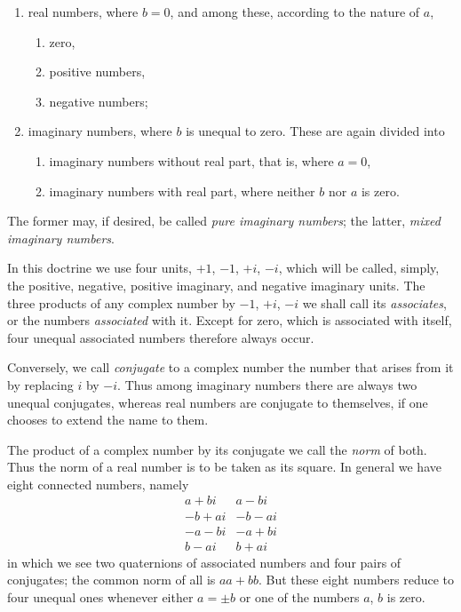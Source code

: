 \documentclass[12pt]{article}
\begin{document}
\begin{enumerate}[label=\Roman*.]
\item real numbers, where $b=0$, and among these, according to the nature of $a$,
    \begin{enumerate}[label=\arabic*)]
    \item zero,
    \item positive numbers,
    \item negative numbers;
    \end{enumerate}
\item imaginary numbers, where $b$ is unequal to zero. These are again divided into
    \begin{enumerate}[label=\arabic*)]
    \item imaginary numbers without real part, that is, where $a=0$,
    \item imaginary numbers with real part, where neither $b$ nor $a$ is zero.
    \end{enumerate}
\end{enumerate}

The former may, if desired, be called \textit{pure imaginary numbers}; the latter, \textit{mixed imaginary numbers}.

In this doctrine we use four units, $+1$, $-1$, $+i$, $-i$, which will be called, simply, the positive, negative, positive imaginary, and negative imaginary units. The three products of any complex number by $-1$, $+i$, $-i$ we shall call its \textit{associates}, or the numbers \textit{associated} with it. Except for zero, which is associated with itself, four unequal associated numbers therefore always occur.

Conversely, we call \textit{conjugate} to a complex number the number that arises from it by replacing $i$ by $-i$. Thus among imaginary numbers there are always two unequal conjugates, whereas real numbers are conjugate to themselves, if one chooses to extend the name to them.

The product of a complex number by its conjugate we call the \textit{norm} of both. Thus the norm of a real number is to be taken as its square. In general we have eight connected numbers, namely
\[
\begin{array}{r|r}
 a+bi & a-bi\\
 -b+ai & -b-ai\\
 -a-bi & -a+bi\\
 b-ai & b+ai
\end{array}
\]
in which we see two quaternions of associated numbers and four pairs of conjugates; the common norm of all is $aa+bb$. But these eight numbers reduce to four unequal ones whenever either $a=\pm b$ or one of the numbers $a$, $b$ is zero.
\end{document}
